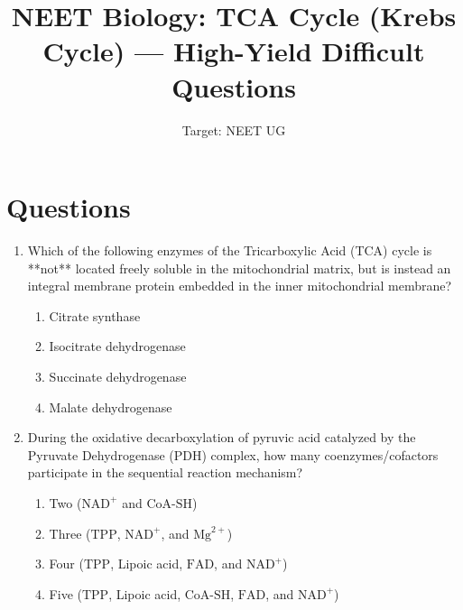 \documentclass[11pt, a4paper]{article}
\title{\textbf{NEET Biology: TCA Cycle (Krebs Cycle) — High-Yield Difficult Questions}}
\author{Target: NEET UG}
\date{}
\begin{document}
\maketitle

\section*{Questions}

\begin{enumerate}[label=\textbf{\arabic*.}]

\item Which of the following enzymes of the Tricarboxylic Acid (TCA) cycle is **not** located freely soluble in the mitochondrial matrix, but is instead an integral membrane protein embedded in the inner mitochondrial membrane?
\begin{enumerate}[label=(\Alph*)]
    \item Citrate synthase
    \item Isocitrate dehydrogenase
    \item Succinate dehydrogenase
    \item Malate dehydrogenase
\end{enumerate}

\item During the oxidative decarboxylation of pyruvic acid catalyzed by the Pyruvate Dehydrogenase (PDH) complex, how many coenzymes/cofactors participate in the sequential reaction mechanism?
\begin{enumerate}[label=(\Alph*)]
    \item Two ($\text{NAD}^+$ and $\text{CoA-SH}$)
    \item Three ($\text{TPP}$, $\text{NAD}^+$, and $\text{Mg}^{2+}$)
    \item Four ($\text{TPP}$, Lipoic acid, $\text{FAD}$, and $\text{NAD}^+$)
    \item Five ($\text{TPP}$, Lipoic acid, $\text{CoA-SH}$, $\text{FAD}$, and $\text{NAD}^+$)
\end{enumerate}


\end{enumerate}
\end{document}
